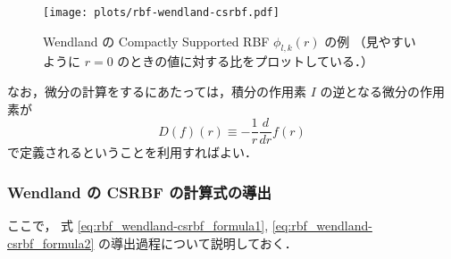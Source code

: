 \begin{figure}[tp]
    \centering
    \texttt{[image: plots/rbf-wendland-csrbf.pdf]}
    \caption{Wendland の Compactly Supported RBF $\phi_{l,k}(r)$ \cite{Wendland1995} の例%
        （見やすいように $r = 0$ のときの値に対する比をプロットしている．）}
    \label{fig:rbf_wendland-csrbf}
\end{figure}

なお，微分の計算をするにあたっては，積分の作用素 $I$ の逆となる微分の作用素が
\begin{equation}
    D(f)(r) \equiv -\frac{1}{r} \frac{d}{dr} f(r)
\end{equation}
で定義されるということを利用すればよい．

\subsubsection{Wendland の CSRBF の計算式の導出}

ここで，
式 \eqref{eq:rbf_wendland-csrbf_formula1}, \eqref{eq:rbf_wendland-csrbf_formula2}
の導出過程について説明しておく．


